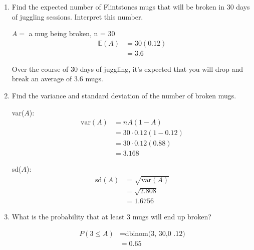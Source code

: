     \begin{enumerate}[label=(\alph*)]
        \item Find the expected number of Flintstones mugs that will be broken in 30 days of
        juggling sessions. Interpret this number.
        \\
        \begin{mdframed}
            $A = $ a mug being broken, n = 30
            \begin{align*}
                \mathbb{E}(A)           & = 30(0.12)    \\
                                        & = \boxed{3.6}
            \end{align*}

            Over the course of 30 days of juggling, it's expected that you will drop and break an average of 3.6 mugs.
        \end{mdframed}

        \item Find the variance and standard deviation of the number of broken mugs.
        \\
        \begin{mdframed}
            var($A$):
            \begin{align*}
                \text{var}(A)   & = nA(1 - A)               \\
                                & = 30 \cdot 0.12(1-0.12)   \\
                                & = 30 \cdot 0.12(0.88)     \\
                                & = \boxed{3.168}
            \end{align*}

            sd($A$):
            \begin{align*}
                \text{sd}(A)    & = \sqrt{\text{var}(A)}    \\
                                & = \sqrt{2.808}            \\
                                & = \boxed{1.6756}
            \end{align*}
        \end{mdframed}

        \item What is the probability that at least 3 mugs will end up broken?
        \\
        \begin{mdframed}
            \begin{align*}
                P(3 \leq A)     & = \text{dbinom(3, 30,0 .12)}     \\
                                & = \boxed{0.65}
            \end{align*}
        \end{mdframed}


\end{enumerate}
